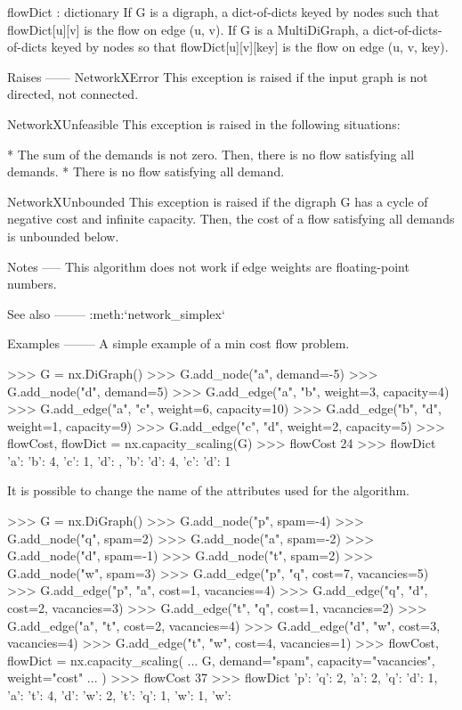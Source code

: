 \begin{DoxyVerb}
flowDict : dictionary
    If G is a digraph, a dict-of-dicts keyed by nodes such that
    flowDict[u][v] is the flow on edge (u, v).
    If G is a MultiDiGraph, a dict-of-dicts-of-dicts keyed by nodes
    so that flowDict[u][v][key] is the flow on edge (u, v, key).

Raises
------
NetworkXError
    This exception is raised if the input graph is not directed,
    not connected.

NetworkXUnfeasible
    This exception is raised in the following situations:

        * The sum of the demands is not zero. Then, there is no
          flow satisfying all demands.
        * There is no flow satisfying all demand.

NetworkXUnbounded
    This exception is raised if the digraph G has a cycle of
    negative cost and infinite capacity. Then, the cost of a flow
    satisfying all demands is unbounded below.

Notes
-----
This algorithm does not work if edge weights are floating-point numbers.

See also
--------
:meth:`network_simplex`

Examples
--------
A simple example of a min cost flow problem.

>>> G = nx.DiGraph()
>>> G.add_node("a", demand=-5)
>>> G.add_node("d", demand=5)
>>> G.add_edge("a", "b", weight=3, capacity=4)
>>> G.add_edge("a", "c", weight=6, capacity=10)
>>> G.add_edge("b", "d", weight=1, capacity=9)
>>> G.add_edge("c", "d", weight=2, capacity=5)
>>> flowCost, flowDict = nx.capacity_scaling(G)
>>> flowCost
24
>>> flowDict
{'a': {'b': 4, 'c': 1}, 'd': {}, 'b': {'d': 4}, 'c': {'d': 1}}

It is possible to change the name of the attributes used for the
algorithm.

>>> G = nx.DiGraph()
>>> G.add_node("p", spam=-4)
>>> G.add_node("q", spam=2)
>>> G.add_node("a", spam=-2)
>>> G.add_node("d", spam=-1)
>>> G.add_node("t", spam=2)
>>> G.add_node("w", spam=3)
>>> G.add_edge("p", "q", cost=7, vacancies=5)
>>> G.add_edge("p", "a", cost=1, vacancies=4)
>>> G.add_edge("q", "d", cost=2, vacancies=3)
>>> G.add_edge("t", "q", cost=1, vacancies=2)
>>> G.add_edge("a", "t", cost=2, vacancies=4)
>>> G.add_edge("d", "w", cost=3, vacancies=4)
>>> G.add_edge("t", "w", cost=4, vacancies=1)
>>> flowCost, flowDict = nx.capacity_scaling(
...     G, demand="spam", capacity="vacancies", weight="cost"
... )
>>> flowCost
37
>>> flowDict
{'p': {'q': 2, 'a': 2}, 'q': {'d': 1}, 'a': {'t': 4}, 'd': {'w': 2}, 't': {'q': 1, 'w': 1}, 'w': {}}
\end{DoxyVerb}
 